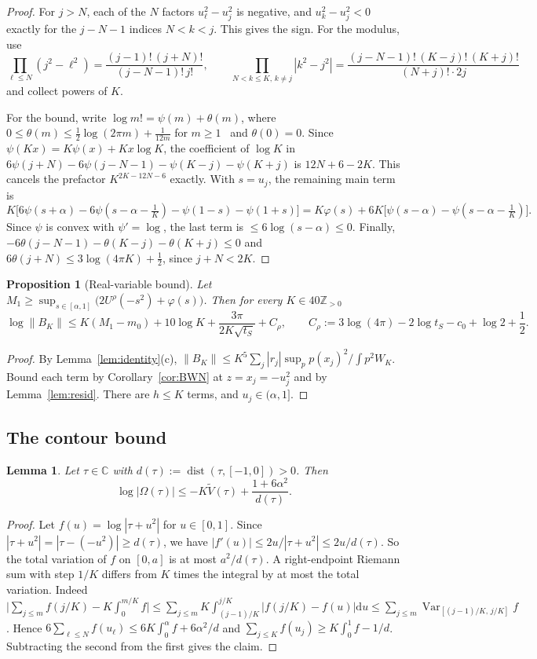 \documentclass[11pt]{article}
\newtheorem{proposition}{Proposition}
\newtheorem{lemma}{Lemma}
\theoremstyle{remark}
\newcommand{\Z}{\mathbb{Z}}
\newcommand{\C}{\mathbb{C}}
\newcommand{\Vt}{\widetilde{V}}
\newcommand{\dd}{\mathrm{d}}
\DeclareMathOperator{\dist}{dist}
\begin{document}
\begin{proof}
For $j>N$, each of the $N$ factors $u_\ell^2-u_j^2$ is negative, and $u_k^2-u_j^2<0$ exactly for the $j-N-1$ indices $N<k<j$. This gives the sign. For the modulus, use
\[
\prod_{\ell\le N}(j^2-\ell^2)=\frac{(j-1)!\,(j+N)!}{(j-N-1)!\,j!},\qquad\prod_{N<k\le K,\,k\ne j}|k^2-j^2|=\frac{(j-N-1)!\,(K-j)!\,(K+j)!}{(N+j)!\cdot2j}
\]
and collect powers of $K$.

For the bound, write $\log m!=\psi(m)+\theta(m)$, where $0\le\theta(m)\le\frac12\log(2\pi m)+\frac1{12m}$ for $m\ge1$~\cite{Ro} and $\theta(0)=0$. Since $\psi(Kx)=K\psi(x)+Kx\log K$, the coefficient of $\log K$ in $6\psi(j+N)-6\psi(j-N-1)-\psi(K-j)-\psi(K+j)$ is $12N+6-2K$. This cancels the prefactor $K^{2K-12N-6}$ exactly. With $s=u_j$, the remaining main term is
\[
K\bigl[6\psi(s+\alpha)-6\psi(s-\alpha-\tfrac1K)-\psi(1-s)-\psi(1+s)\bigr]=K\varphi(s)+6K\bigl[\psi(s-\alpha)-\psi(s-\alpha-\tfrac1K)\bigr].
\]
Since $\psi$ is convex with $\psi'=\log$, the last term is $\le6\log(s-\alpha)\le0$. Finally, $-6\theta(j-N-1)-\theta(K-j)-\theta(K+j)\le0$ and $6\theta(j+N)\le3\log(4\pi K)+\frac12$, since $j+N<2K$.
\end{proof}

\begin{proposition}[Real-variable bound]\label{prop:realvar}
Let $M_1\ge\sup_{s\in[\alpha,1]}\bigl(2U^\rho(-s^2)+\varphi(s)\bigr)$. Then for every $K\in40\Z_{>0}$
\[
\log\|B_K\|\le K(M_1-m_0)+10\log K+\frac{3\pi}{2K\sqrt{t_S}}+C_\rho,\qquad C_\rho:=3\log(4\pi)-2\log t_S-c_0+\log2+\frac12 .
\]
\end{proposition}

\begin{proof}
By Lemma~\ref{lem:identity}(c), $\|B_K\|\le K^5\sum_j|r_j|\sup_p p(x_j)^2/\int p^2W_K$. Bound each term by Corollary~\ref{cor:BWN} at $z=x_j=-u_j^2$ and by Lemma~\ref{lem:resid}. There are $h\le K$ terms, and $u_j\in(\alpha,1]$.
\end{proof}

\subsection{The contour bound}

\begin{lemma}\label{lem:omega}
Let $\tau\in\C$ with $d(\tau):=\dist(\tau,[-1,0])>0$. Then
\[
\log|\Omega(\tau)|\le-K\Vt(\tau)+\frac{1+6\alpha^2}{d(\tau)} .
\]
\end{lemma}

\begin{proof}
Let $f(u)=\log|\tau+u^2|$ for $u\in[0,1]$. Since $|\tau+u^2|=|\tau-(-u^2)|\ge d(\tau)$, we have $|f'(u)|\le2u/|\tau+u^2|\le2u/d(\tau)$. So the total variation of $f$ on $[0,a]$ is at most $a^2/d(\tau)$. A right-endpoint Riemann sum with step $1/K$ differs from $K$ times the integral by at most the total variation. Indeed $\bigl|\sum_{j\le m}f(j/K)-K\int_0^{m/K}f\bigr|\le\sum_{j\le m}K\int_{(j-1)/K}^{j/K}|f(j/K)-f(u)|\dd u\le\sum_{j\le m}\operatorname{Var}_{[(j-1)/K,\,j/K]}f$. Hence $6\sum_{\ell\le N}f(u_\ell)\le6K\int_0^\alpha f+6\alpha^2/d$ and $\sum_{j\le K}f(u_j)\ge K\int_0^1f-1/d$. Subtracting the second from the first gives the claim.
\end{proof}
\end{document}
